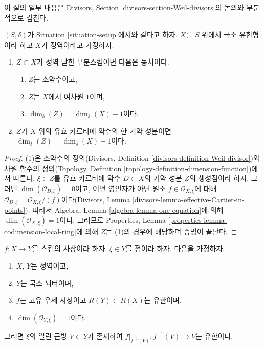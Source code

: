 \noindent
이 절의 일부 내용은 Divisors, Section
\ref{divisors-section-Weil-divisors}의 논의와 부분적으로 겹친다.

\begin{lemma}
\label{lemma-divisor-delta-dimension}
$(S, \delta)$가 Situation \ref{situation-setup}에서와 같다고 하자.
$X$를 $S$ 위에서 국소 유한형이라 하고 $X$가 정역이라고 가정하자.
\begin{enumerate}
\item $Z \subset X$가 정역 닫힌 부분스킴이면 다음은 동치이다.
\begin{enumerate}
\item $Z$는 소약수이고,
\item $Z$는 $X$에서 여차원 $1$이며,
\item $\dim_\delta(Z) = \dim_\delta(X) - 1$이다.
\end{enumerate}
\item $Z$가 $X$ 위의 유효 카르티에 약수의 한 기약 성분이면
$\dim_\delta(Z) = \dim_\delta(X) - 1$이다.
\end{enumerate}
\end{lemma}

\begin{proof}
(1)은 소약수의 정의(Divisors, Definition
\ref{divisors-definition-Weil-divisor})와 차원 함수의 정의(Topology,
Definition \ref{topology-definition-dimension-function})에서 따른다.
$\xi \in Z$를 유효 카르티에 약수 $D \subset X$의 기약 성분 $Z$의
생성점이라 하자. 그러면 $\dim(\mathcal{O}_{D, \xi}) = 0$이고, 어떤
영인자가 아닌 원소 $f \in \mathcal{O}_{X, \xi}$에 대해
$\mathcal{O}_{D, \xi} = \mathcal{O}_{X, \xi}/(f)$이다(Divisors, Lemma
\ref{divisors-lemma-effective-Cartier-in-points}). 따라서 Algebra, Lemma
\ref{algebra-lemma-one-equation}에 의해
$\dim(\mathcal{O}_{X, \xi}) = 1$이다. 그러므로 Properties, Lemma
\ref{properties-lemma-codimension-local-ring}에 의해 $Z$는 (1)의
경우에 해당하며 증명이 끝난다.
\end{proof}

\begin{lemma}
\label{lemma-finite-in-codimension-one}
$f : X \to Y$를 스킴의 사상이라 하자.
$\xi \in Y$를 점이라 하자. 다음을 가정하자.
\begin{enumerate}
\item $X$, $Y$는 정역이고,
\item $Y$는 국소 뇌터이며,
\item $f$는 고유 우세 사상이고 $R(Y) \subset R(X)$는 유한이며,
\item $\dim(\mathcal{O}_{Y, \xi}) = 1$이다.
\end{enumerate}
그러면 $\xi$의 열린 근방 $V \subset Y$가 존재하여
$f|_{f^{-1}(V)} : f^{-1}(V) \to V$는 유한이다.
\end{lemma}

